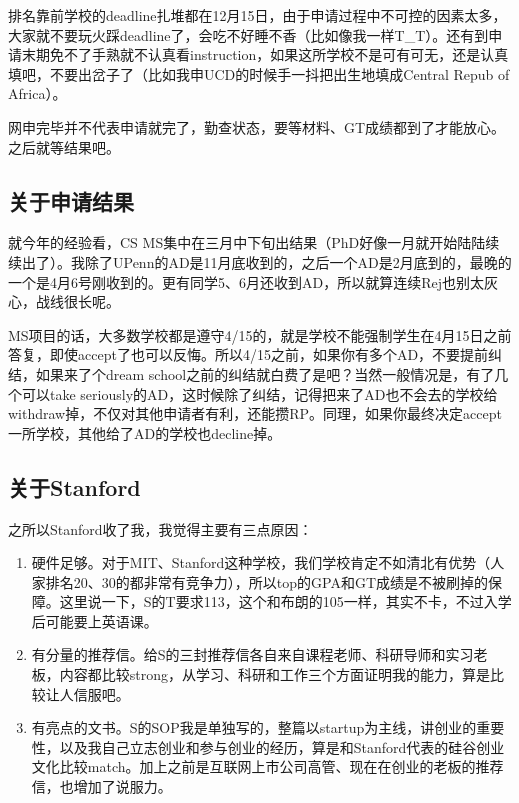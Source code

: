 排名靠前学校的deadline扎堆都在12月15日，由于申请过程中不可控的因素太多，大家就不要玩火踩deadline了，会吃不好睡不香（比如像我一样T\_T）。还有到申请末期免不了手熟就不认真看instruction，如果这所学校不是可有可无，还是认真填吧，不要出岔子了（比如我申UCD的时候手一抖把出生地填成Central Repub of Africa）。\par

网申完毕并不代表申请就完了，勤查状态，要等材料、GT成绩都到了才能放心。之后就等结果吧。

\subsection{关于申请结果}

就今年的经验看，CS MS集中在三月中下旬出结果（PhD好像一月就开始陆陆续续出了）。我除了UPenn的AD是11月底收到的，之后一个AD是2月底到的，最晚的一个是4月6号刚收到的。更有同学5、6月还收到AD，所以就算连续Rej也别太灰心，战线很长呢。\par

MS项目的话，大多数学校都是遵守4/15的，就是学校不能强制学生在4月15日之前答复，即使accept了也可以反悔。所以4/15之前，如果你有多个AD，不要提前纠结，如果来了个dream school之前的纠结就白费了是吧？当然一般情况是，有了几个可以take seriously的AD，这时候除了纠结，记得把来了AD也不会去的学校给withdraw掉，不仅对其他申请者有利，还能攒RP。同理，如果你最终决定accept一所学校，其他给了AD的学校也decline掉。

\subsection{关于Stanford}
之所以Stanford收了我，我觉得主要有三点原因：\par
\begin{enumerate}
\item 硬件足够。对于MIT、Stanford这种学校，我们学校肯定不如清北有优势（人家排名20、30的都非常有竞争力），所以top的GPA和GT成绩是不被刷掉的保障。这里说一下，S的T要求113，这个和布朗的105一样，其实不卡，不过入学后可能要上英语课。
\item 有分量的推荐信。给S的三封推荐信各自来自课程老师、科研导师和实习老板，内容都比较strong，从学习、科研和工作三个方面证明我的能力，算是比较让人信服吧。
\item 有亮点的文书。S的SOP我是单独写的，整篇以startup为主线，讲创业的重要性，以及我自己立志创业和参与创业的经历，算是和Stanford代表的硅谷创业文化比较match。加上之前是互联网上市公司高管、现在在创业的老板的推荐信，也增加了说服力。
\end{enumerate}

